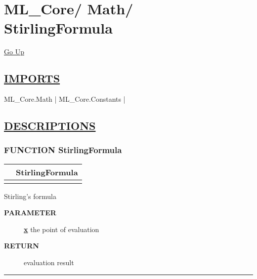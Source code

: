 \chapter*{\color{headfile}
{\large ML\_Core\slash\hspace{0pt}}
{\large Math\slash\hspace{0pt}}
 \\
StirlingFormula
}
\hypertarget{ecldoc:toc:ML_Core.Math.StirlingFormula}{}
\hyperlink{ecldoc:toc:root/ML_Core/Math}{Go Up}

\section*{\underline{\textsf{IMPORTS}}}
\begin{doublespace}
{\large
ML\_Core.Math |
ML\_Core.Constants |
}
\end{doublespace}

\section*{\underline{\textsf{DESCRIPTIONS}}}
\subsection*{\textsf{\colorbox{headtoc}{\color{white} FUNCTION}
StirlingFormula}}

\hypertarget{ecldoc:ml_core.math.stirlingformula}{}

{\renewcommand{\arraystretch}{1.5}
\begin{tabularx}{\textwidth}{|>{\raggedright\arraybackslash}l|X|}
\hline
\hspace{0pt}\mytexttt{\color{red} } & \textbf{StirlingFormula} \\
\hline
\multicolumn{2}{|>{\raggedright\arraybackslash}X|}{\hspace{0pt}\mytexttt{\color{param} (REAL x)}} \\
\hline
\end{tabularx}
}

\par
Stirling's formula

\par
\begin{description}
\item [\colorbox{tagtype}{\color{white} \textbf{\textsf{PARAMETER}}}] \textbf{\underline{x}} the point of evaluation
\item [\colorbox{tagtype}{\color{white} \textbf{\textsf{RETURN}}}] \textbf{\underline{}} evaluation result
\end{description}

\rule{\linewidth}{0.5pt}
